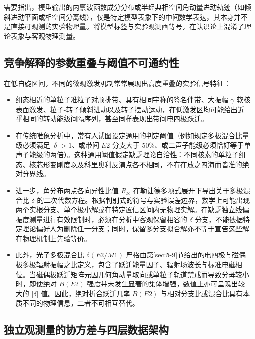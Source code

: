 需要指出，模型输出的内禀波函数成分分布或半经典相空间角动量进动轨迹（如倾斜进动平面或相空间分离线），仅是特定模型表象下的中间数学表达，其本身并不是直接可观测的实验物理量。将模型标签与实验观测画等号，在认识论上混淆了理论表象与客观物理测量。

\subsection{竞争解释的参数重叠与阈值不可通约性}\label{sec:3-8-2}

在低自旋区间，不同的微观激发机制常常展现出高度重叠的实验信号特征：
\begin{itemize}
\item 组态相近的单粒子准粒子对顺排带、具有相同宇称的签名伴带、大振幅 $\gamma$ 软核表面激发、粒子-转子倾斜进动以及转子摆动运动，在低激发区均可能给出近乎相同的转动能级间隔序列，甚至同样表现出带间电四极跃迁。
\item 在传统唯象分析中，常有人试图设定通用的判定阈值（例如规定多极混合比量级必须满足 $|\delta| > 1$、或带间 $E2$ 分支大于 $50\%$、或二声子能级必须恰好等于单声子能级的两倍）。这种通用阈值假定缺乏理论自洽性：不同核素的单粒子组态、核芯形变刚度以及科里奥利反演点各不相同，不存在放之四海而皆准的绝对分界线。
\item 进一步，角分布两点各向异性比值 $R_{\mathrm{ac}}$ 在勒让德多项式展开下导出关于多极混合比 $\delta$ 的二次代数方程。根据判别式的符号与实验误差边界，数学上可能出现两个实根分支、单个极小解或在特定置信区间内无物理实解。在缺乏独立线偏振度测量进行有效限制时，必须在分析中客观保留相容的 $\delta$ 分支，不能依据特定理论偏好人为删除任一分支；同时，保留多分支拟合解亦不等于宣告这些解在物理机制上先验等价。
\item 此外，光子多极混合比 $\delta(E2/M1)$ 严格由第\ref{sec:5-9}节给出的电四极与磁偶极多极辐射振幅之比定义，包含了跃迁能量因子、辐射场波长与标准电磁相位。当磁偶极跃迁矩阵元因几何角动量取向或单粒子轨道禁戒而导致分母较小时，即使绝对 $B(E2)$ 强度并未发生显著的集体增强，数值上亦可呈现出较大的 $|\delta|$ 值。因此，绝对折合跃迁几率 $B(E2)$ 与相对分支比或混合比具有本质不同的物理信息，二者不可相互替代。
\end{itemize}

\subsection{独立观测量的协方差与四层数据架构}\label{sec:3-8-3}


